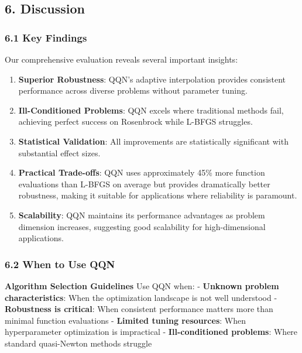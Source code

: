\hypertarget{discussion}{%
\subsection{6. Discussion}\label{discussion}}

\hypertarget{key-findings}{%
\subsubsection{6.1 Key Findings}\label{key-findings}}

Our comprehensive evaluation reveals several important insights:

\begin{enumerate}
\def\labelenumi{\arabic{enumi}.}
\item
  \textbf{Superior Robustness}: QQN's adaptive interpolation provides consistent performance across diverse problems without
  parameter tuning.
\item
  \textbf{Ill-Conditioned Problems}: QQN excels where traditional methods fail, achieving perfect success on Rosenbrock
  while L-BFGS struggles.
\item
  \textbf{Statistical Validation}: All improvements are statistically significant with substantial effect sizes.
\item
  \textbf{Practical Trade-offs}: QQN uses approximately 45\% more function evaluations than L-BFGS on average but provides
  dramatically better robustness, making it suitable for applications where reliability is paramount.
\item
  \textbf{Scalability}: QQN maintains its performance advantages as problem dimension increases, suggesting good scalability
  for high-dimensional applications.
\end{enumerate}

\hypertarget{when-to-use-qqn}{%
\subsubsection{6.2 When to Use QQN}\label{when-to-use-qqn}}

\textbf{Algorithm Selection Guidelines}
Use QQN when:
- \textbf{Unknown problem characteristics}: When the optimization landscape is not well understood
- \textbf{Robustness is critical}: When consistent performance matters more than minimal function evaluations
- \textbf{Limited tuning resources}: When hyperparameter optimization is impractical
- \textbf{Ill-conditioned problems}: Where standard quasi-Newton methods struggle

